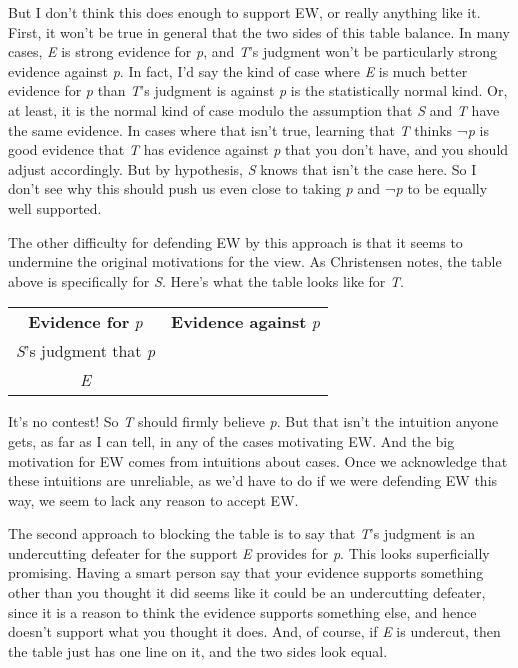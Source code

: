 \documentclass[
  10pt,
  letterpaper,
  DIV=11,
  numbers=noendperiod,
  twoside]{scrartcl}
\begin{document}
But I don't think this does enough to support EW, or really anything
like it. First, it won't be true in general that the two sides of this
table balance. In many cases, \emph{E} is strong evidence for \emph{p},
and \emph{T}'s judgment won't be particularly strong evidence against
\emph{p}. In fact, I'd say the kind of case where \emph{E} is much
better evidence for \emph{p} than \emph{T}'s judgment is against
\emph{p} is the statistically normal kind. Or, at least, it is the
normal kind of case modulo the assumption that \emph{S} and \emph{T}
have the same evidence. In cases where that isn't true, learning that
\emph{T} thinks ¬\emph{p} is good evidence that \emph{T} has evidence
against \emph{p} that you don't have, and you should adjust accordingly.
But by hypothesis, \emph{S} knows that isn't the case here. So I don't
see why this should push us even close to taking \emph{p} and ¬\emph{p}
to be equally well supported.

The other difficulty for defending EW by this approach is that it seems
to undermine the original motivations for the view. As Christensen
notes, the table above is specifically for \emph{S}. Here's what the
table looks like for \emph{T}.

\begin{longtable}[]{@{}cc@{}}
\toprule\noalign{}
\endhead
\bottomrule\noalign{}
\endlastfoot
\textbf{Evidence for} \emph{p} & \textbf{Evidence against} \emph{p} \\
\emph{S}'s judgment that \emph{p} & \\
\emph{E} & \\
\end{longtable}

It's no contest! So \emph{T} should firmly believe \emph{p}. But that
isn't the intuition anyone gets, as far as I can tell, in any of the
cases motivating EW. And the big motivation for EW comes from intuitions
about cases. Once we acknowledge that these intuitions are unreliable,
as we'd have to do if we were defending EW this way, we seem to lack any
reason to accept EW.

The second approach to blocking the table is to say that \emph{T}'s
judgment is an undercutting defeater for the support \emph{E} provides
for \emph{p}. This looks superficially promising. Having a smart person
say that your evidence supports something other than you thought it did
seems like it could be an undercutting defeater, since it is a reason to
think the evidence supports something else, and hence doesn't support
what you thought it does. And, of course, if \emph{E} is undercut, then
the table just has one line on it, and the two sides look equal.
\end{document}
